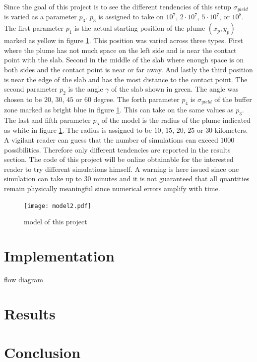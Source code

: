 \documentclass[12pt]{scrartcl}
\begin{document}
Since the goal of this project is to see the different tendencies of this setup $\sigma_{yield}$ is varied as a parameter $p_3$. $p_3$ is assigned to take on $10^7$, $2\cdot 10^7$, $5\cdot 10^7$, or $10^8$. The first parameter $p_1$ is the actual starting position of the plume $(x_p,y_p)$ marked as yellow in figure \ref{fig:tm}. This position was varied across three types. First where the plume has not much space on the left side and is near the contact point with the slab. Second in the middle of the slab where enough space is on both sides and the contact point is near or far away. And lastly the third position is near the edge of the slab and has the most distance to the contact point.
The second parameter $p_2$ is the angle $\gamma$ of the slab shown in green. The angle was chosen to be $20$, $30$, $45$ or $60$ degree. The forth parameter $p_4$ is $\sigma_{yield}$ of the buffer zone marked as bright blue in figure \ref{fig:tm}. This can take on the same values as $p_3$. The last and fifth parameter $p_5$ of the model is the radius of the plume indicated as white in figure \ref{fig:tm}. The radius is assigned to be $10$, $15$, $20$, $25$ or $30$ kilometers. A vigilant reader can guess that the number of simulations can exceed $1000$ possibilities. Therefore only different tendencies are reported in the results section. The code of this project will be online obtainable for the interested reader to try different simulations himself. A warning is here issued since one simulation can take up to $30$ minutes and it is not guaranteed that all quantities remain physically meaningful since numerical errors amplify with time.

\begin{figure}[!ht]
\texttt{[image: model2.pdf]}
\label{fig:tm}
\caption{model of this project}
\end{figure}



\section{Implementation}
\label{seq:impl}

flow diagram

\section{Results}
\section{Conclusion}

\nocite{vargas2013tearing}
\nocite{gerya2009introduction}




\newpage



\end{document}
